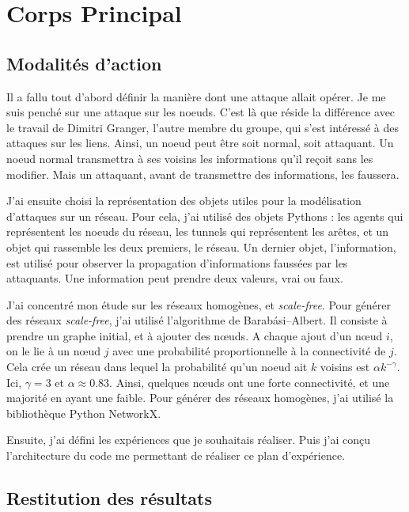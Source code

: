 \documentclass[12pt,a4paper]{article}
\begin{document}
\section{Corps Principal} %

\subsection{Modalités d'action} %

Il a fallu tout d'abord définir la manière dont une attaque allait opérer.
Je me suis penché sur une attaque sur les noeuds.
C'est là que réside la différence avec le travail de Dimitri Granger, l'autre membre du groupe, qui s'est intéressé à des attaques sur les liens.
Ainsi, un noeud peut être soit normal, soit attaquant.
Un noeud normal transmettra à ses voisins les informations qu'il reçoit sans les modifier.
Mais un attaquant, avant de transmettre des informations, les faussera.


J'ai ensuite choisi la représentation des objets utiles pour la modélisation d'attaques sur un réseau.
Pour cela, j'ai utilisé des objets Pythons : les agents qui représentent les noeuds du réseau, les tunnels qui représentent les arêtes, et un objet qui rassemble les deux premiers, le réseau.
Un dernier objet, l'information, est utilisé pour observer la propagation d'informations faussées par les attaquants.
Une information peut prendre deux valeurs, vrai ou faux.


J'ai concentré mon étude sur les réseaux homogènes, et \emph{scale-free}.
Pour générer des réseaux \emph{scale-free}, j'ai utilisé l'algorithme de Barabási–Albert.
Il consiste à prendre un graphe initial, et à ajouter des nœuds.
A chaque ajout d'un nœud $i$, on le lie à un nœud $j$ avec une probabilité proportionnelle à la connectivité de $j$.
Cela crée un réseau dans lequel la probabilité qu'un noeud ait $k$ voisins est $\alpha k^{-\gamma}$.
Ici, $\gamma = 3$ et $\alpha \approx 0.83$.
Ainsi, quelques nœuds ont une forte connectivité, et une majorité en ayant une faible.
Pour générer des réseaux homogènes, j'ai utilisé la bibliothèque Python NetworkX.

Ensuite, j'ai défini les expériences que je souhaitais réaliser.
Puis j'ai conçu l'architecture du code me permettant de réaliser ce plan d'expérience.


\subsection{Restitution des résultats} %
\end{document}
